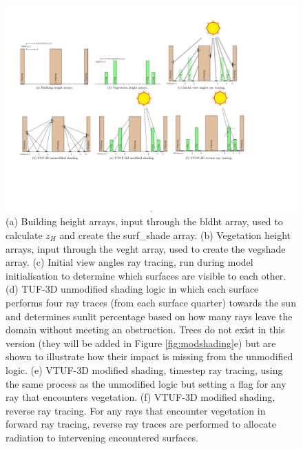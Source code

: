\documentclass[preprint,12pt,authoryear]{elsarticle}
\begin{document}
\begin{figure}[!htbp]
\includegraphics[trim = 13mm 50mm 52mm 15mm, clip, scale=0.75]{images/ModelDiagramsCombined.pdf}
   \caption{(a) Building height arrays, input through the bldht array, used to calculate $z_{H}$ and create the surf\_shade array. \label{fig:bldht} (b) Vegetation height arrays, input through the veght array, used to create the vegshade array. \label{fig:veght} (c) Initial view angles ray tracing, run during model initialisation to determine which surfaces are visible to each other. \label{fig:initray} (d) TUF-3D unmodified shading logic in which each surface performs four ray traces (from each surface quarter) towards the sun and determines sunlit percentage based on how many rays leave the domain without meeting an obstruction. Trees do not exist in this version (they will be added in Figure \ref{fig:modshading}e) but are shown to illustrate how their impact is missing from the unmodified logic. \label{fig:shading} (e) VTUF-3D modified shading, timestep ray tracing, using the same process as the unmodified logic but setting a flag for any ray that encounters vegetation. \label{fig:modshading} (f) VTUF-3D modified shading, reverse ray tracing. For any rays that encounter vegetation in forward ray tracing, reverse ray traces are performed to allocate radiation to intervening encountered surfaces. \label{fig:modshadingreverse}} 
\end{figure}











\end{document}
